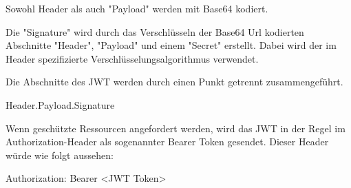 Sowohl Header als auch "Payload" werden mit Base64 kodiert.

Die "Signature" wird durch das Verschlüsseln der Base64 Url kodierten Abschnitte "Header", "Payload" und einem "Secret" erstellt. 
Dabei wird der im Header spezifizierte Verschlüsselungsalgorithmus verwendet.\cite{RFC7519}\cite{WdsJWT}

Die Abschnitte des JWT werden durch einen Punkt getrennt zusammengeführt. 

{\ttfamily Header.Payload.Signature}

Wenn geschützte Ressourcen angefordert werden, wird das JWT in der Regel im Authorization-Header als sogenannter Bearer Token gesendet. Dieser Header würde wie folgt aussehen\cite{Auth0JWT}:

{\ttfamily Authorization: Bearer \textless JWT Token\textgreater}


